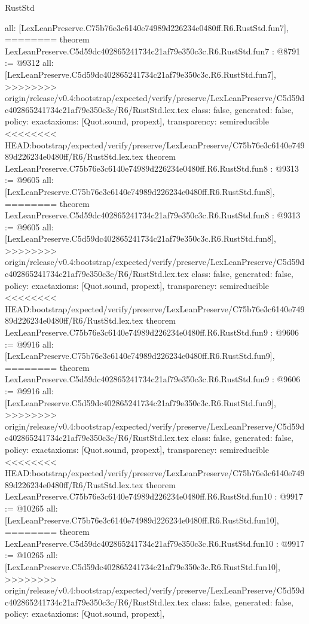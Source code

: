 \begin{lexlean}{RustStd}
\begin{coremodule}
{\begin{coremodule}
{{{{{{{{{{  all: [LexLeanPreserve.C75b76e3c6140e74989d226234e0480ff.R6.RustStd.fun7],
========
theorem LexLeanPreserve.C5d59dc402865241734c21af79e350c3c.R6.RustStd.fun7 : @8791 := @9312 {
  all: [LexLeanPreserve.C5d59dc402865241734c21af79e350c3c.R6.RustStd.fun7],
>>>>>>>> origin/release/v0.4:bootstrap/expected/verify/preserve/LexLeanPreserve/C5d59dc402865241734c21af79e350c3c/R6/RustStd.lex.tex
  class: false,
  generated: false,
  policy: exact{axioms: [Quot.sound, propext]},
  transparency: semireducible
}
<<<<<<<< HEAD:bootstrap/expected/verify/preserve/LexLeanPreserve/C75b76e3c6140e74989d226234e0480ff/R6/RustStd.lex.tex
theorem LexLeanPreserve.C75b76e3c6140e74989d226234e0480ff.R6.RustStd.fun8 : @9313 := @9605 {
  all: [LexLeanPreserve.C75b76e3c6140e74989d226234e0480ff.R6.RustStd.fun8],
========
theorem LexLeanPreserve.C5d59dc402865241734c21af79e350c3c.R6.RustStd.fun8 : @9313 := @9605 {
  all: [LexLeanPreserve.C5d59dc402865241734c21af79e350c3c.R6.RustStd.fun8],
>>>>>>>> origin/release/v0.4:bootstrap/expected/verify/preserve/LexLeanPreserve/C5d59dc402865241734c21af79e350c3c/R6/RustStd.lex.tex
  class: false,
  generated: false,
  policy: exact{axioms: [Quot.sound, propext]},
  transparency: semireducible
}
<<<<<<<< HEAD:bootstrap/expected/verify/preserve/LexLeanPreserve/C75b76e3c6140e74989d226234e0480ff/R6/RustStd.lex.tex
theorem LexLeanPreserve.C75b76e3c6140e74989d226234e0480ff.R6.RustStd.fun9 : @9606 := @9916 {
  all: [LexLeanPreserve.C75b76e3c6140e74989d226234e0480ff.R6.RustStd.fun9],
========
theorem LexLeanPreserve.C5d59dc402865241734c21af79e350c3c.R6.RustStd.fun9 : @9606 := @9916 {
  all: [LexLeanPreserve.C5d59dc402865241734c21af79e350c3c.R6.RustStd.fun9],
>>>>>>>> origin/release/v0.4:bootstrap/expected/verify/preserve/LexLeanPreserve/C5d59dc402865241734c21af79e350c3c/R6/RustStd.lex.tex
  class: false,
  generated: false,
  policy: exact{axioms: [Quot.sound, propext]},
  transparency: semireducible
}
<<<<<<<< HEAD:bootstrap/expected/verify/preserve/LexLeanPreserve/C75b76e3c6140e74989d226234e0480ff/R6/RustStd.lex.tex
theorem LexLeanPreserve.C75b76e3c6140e74989d226234e0480ff.R6.RustStd.fun10 : @9917 := @10265 {
  all: [LexLeanPreserve.C75b76e3c6140e74989d226234e0480ff.R6.RustStd.fun10],
========
theorem LexLeanPreserve.C5d59dc402865241734c21af79e350c3c.R6.RustStd.fun10 : @9917 := @10265 {
  all: [LexLeanPreserve.C5d59dc402865241734c21af79e350c3c.R6.RustStd.fun10],
>>>>>>>> origin/release/v0.4:bootstrap/expected/verify/preserve/LexLeanPreserve/C5d59dc402865241734c21af79e350c3c/R6/RustStd.lex.tex
  class: false,
  generated: false,
  policy: exact{axioms: [Quot.sound, propext]},
}}}}}}}}}}}}}}
\end{coremodule}}
\end{coremodule}
\end{lexlean}

